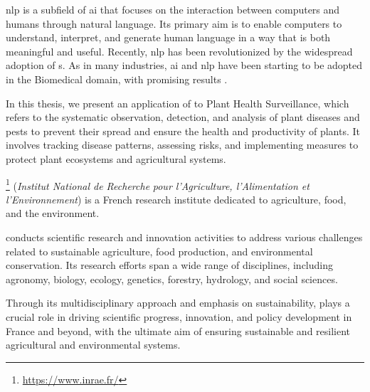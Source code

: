 \label{01_motivation}


\gls{nlp} is a subfield of \gls{ai} that focuses on the interaction between computers and humans through natural language. Its primary aim is to enable computers to understand, interpret, and generate human language in a way that is both meaningful and useful.
Recently, \gls{nlp} has been revolutionized by the widespread adoption of \neuralNetwork{}s. 
As in many industries, \gls{ai} and \gls{nlp} have been starting to be adopted in the Biomedical domain, with promising results . 



In this thesis, we present an application of \textclassification{} to Plant Health Surveillance, which refers to the systematic observation, detection, and analysis of plant diseases and pests to prevent their spread and ensure the health and productivity of plants. It involves tracking disease patterns, assessing risks, and implementing measures to protect plant ecosystems and agricultural systems.





\label{01_2_1_INRAE}

\href{https://www.inrae.fr/}{\INRAE{} }\footnote{\url{https://www.inrae.fr/}}  (\emph{Institut National de Recherche} \emph{pour l'Agriculture, l'Alimentation et l'Environnement}) is a French research institute dedicated to agriculture, food, and the environment. 

\INRAE{} conducts scientific research and innovation activities to address various challenges related to sustainable agriculture, food production, and environmental conservation. Its research efforts span a wide range of disciplines, including agronomy, biology, ecology, genetics, forestry, hydrology, and social sciences.

Through its multidisciplinary approach and emphasis on sustainability, \INRAE{} plays a crucial role in driving scientific progress, innovation, and policy development in France and beyond, with the ultimate aim of ensuring sustainable and resilient agricultural and environmental systems.

